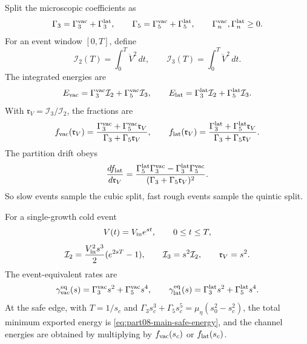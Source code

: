 Split the microscopic coefficients as
\begin{equation}
\label{eq:part08-stage252-split}
\Gamma_3=\Gamma_3^{\rm vac}+\Gamma_3^{\rm lat},
\qquad
\Gamma_5=\Gamma_5^{\rm vac}+\Gamma_5^{\rm lat},
\qquad
\Gamma_n^{\rm vac},\Gamma_n^{\rm lat}\ge0.
\end{equation}
For an event window \([0,T]\), define
\begin{equation}
\label{eq:part08-stage252-shape-integrals}
\mathcal I_2(T)=\int_0^T\ddot V^{2}\,dt,
\qquad
\mathcal I_3(T)=\int_0^T\dddot V^{2}\,dt.
\end{equation}
The integrated energies are
\begin{equation}
\label{eq:part08-stage252-evac-elat}
E_{\rm vac}=\Gamma_3^{\rm vac}\mathcal I_2+\Gamma_5^{\rm vac}\mathcal I_3,
\qquad
E_{\rm lat}=\Gamma_3^{\rm lat}\mathcal I_2+\Gamma_5^{\rm lat}\mathcal I_3.
\end{equation}
With \(\mathfrak r_V=\mathcal I_3/\mathcal I_2\), the fractions are
\begin{equation}
\label{eq:part08-stage252-fractions}
f_{\rm vac}(\mathfrak r_V)=
\frac{\Gamma_3^{\rm vac}+\Gamma_5^{\rm vac}\mathfrak r_V}{\Gamma_3+\Gamma_5\mathfrak r_V},
\qquad
f_{\rm lat}(\mathfrak r_V)=
\frac{\Gamma_3^{\rm lat}+\Gamma_5^{\rm lat}\mathfrak r_V}{\Gamma_3+\Gamma_5\mathfrak r_V}.
\end{equation}
The partition drift obeys
\begin{equation}
\label{eq:part08-stage252-fraction-drift}
\frac{df_{\rm lat}}{d\mathfrak r_V}
=
\frac{\Gamma_5^{\rm lat}\Gamma_3^{\rm vac}-\Gamma_3^{\rm lat}\Gamma_5^{\rm vac}}{(\Gamma_3+\Gamma_5\mathfrak r_V)^2}.
\end{equation}
So slow events sample the cubic split, fast rough events sample the quintic split.

For a single-growth cold event
\begin{equation}
\label{eq:part08-stage252-single-growth}
V(t)=V_{\rm in}e^{st},
\qquad
0\le t\le T,
\end{equation}
\begin{equation}
\label{eq:part08-stage252-single-growth-integrals}
\mathcal I_2=\frac{V_{\rm in}^{2}s^3}{2}(e^{2sT}-1),
\qquad
\mathcal I_3=s^2\mathcal I_2,
\qquad
\mathfrak r_V=s^2.
\end{equation}
The event-equivalent rates are
\begin{equation}
\label{eq:part08-stage252-equivalent-rates}
\gamma_{\rm vac}^{\rm eq}(s)=\Gamma_3^{\rm vac}s^2+\Gamma_5^{\rm vac}s^4,
\qquad
\gamma_{\rm lat}^{\rm eq}(s)=\Gamma_3^{\rm lat}s^2+\Gamma_5^{\rm lat}s^4.
\end{equation}
At the safe edge, with \(T=1/s_c\) and \(\Gamma_3s_c^3+\Gamma_5s_c^5=\mu_\eta(s_0^2-s_c^2)\), the total minimum exported energy is \cref{eq:part08-main-safe-energy}, and the channel energies are obtained by multiplying by \(f_{\rm vac}(s_c)\) or \(f_{\rm lat}(s_c)\).

